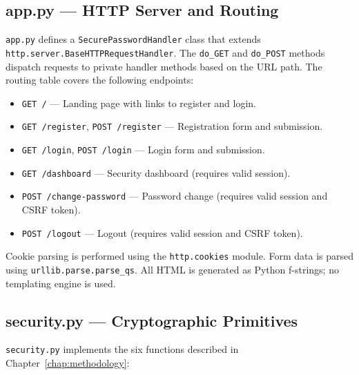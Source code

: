 \subsection{app.py --- HTTP Server and Routing}
\label{sec:impl_app}

\texttt{app.py} defines a \texttt{SecurePasswordHandler} class that extends \texttt{http.server.BaseHTTPRequestHandler}. The \texttt{do\_GET} and \texttt{do\_POST} methods dispatch requests to private handler methods based on the URL path. The routing table covers the following endpoints:

\begin{itemize}
  \item \texttt{GET /} --- Landing page with links to register and login.
  \item \texttt{GET /register}, \texttt{POST /register} --- Registration form and submission.
  \item \texttt{GET /login}, \texttt{POST /login} --- Login form and submission.
  \item \texttt{GET /dashboard} --- Security dashboard (requires valid session).
  \item \texttt{POST /change-password} --- Password change (requires valid session and CSRF token).
  \item \texttt{POST /logout} --- Logout (requires valid session and CSRF token).
\end{itemize}

Cookie parsing is performed using the \texttt{http.cookies} module. Form data is parsed using \texttt{urllib.parse.parse\_qs}. All HTML is generated as Python f-strings; no templating engine is used.

\subsection{security.py --- Cryptographic Primitives}
\label{sec:impl_security}

\texttt{security.py} implements the six functions described in Chapter~\ref{chap:methodology}:

